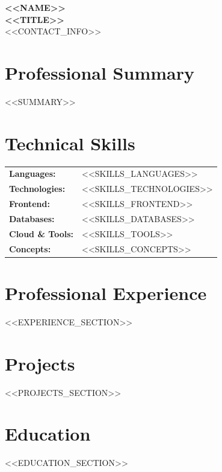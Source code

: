 \documentclass[10pt,a4paper]{article}
\begin{document}
\begin{center}
    {\Huge \textbf{<<NAME>>}} \\[3pt]
    {\large \textbf{<<TITLE>>}} \\[5pt]

    <<CONTACT_INFO>>
\end{center}

\section*{Professional Summary}

\noindent <<SUMMARY>>

\section*{Technical Skills}

\begin{tabular}{@{}p{} p{}}
\textbf{Languages:} & <<SKILLS_LANGUAGES>> \\
\textbf{Technologies:} & <<SKILLS_TECHNOLOGIES>> \\
\textbf{Frontend:} & <<SKILLS_FRONTEND>> \\
\textbf{Databases:} & <<SKILLS_DATABASES>> \\
\textbf{Cloud \& Tools:} & <<SKILLS_TOOLS>> \\
\textbf{Concepts:} & <<SKILLS_CONCEPTS>> \\
\end{tabular}

\section*{Professional Experience}
<<EXPERIENCE_SECTION>>

\section*{Projects}
<<PROJECTS_SECTION>>

\section*{Education}
<<EDUCATION_SECTION>>
\end{document}
